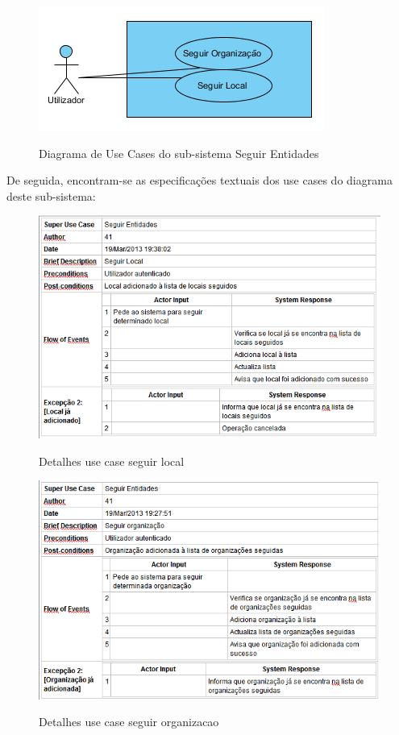\documentclass[12pt,a4paper]{article}
\begin{document}
\begin{figure}[h!]
\centering
\includegraphics[scale=1]{usecase/U_SeguirEntidades}
\label{usecase}
\caption{Diagrama de Use Cases do sub-sistema Seguir Entidades}
\end{figure}

De seguida, encontram-se as especificações textuais dos use cases do diagrama deste sub-sistema:\\


\begin{figure}[h!]
\centering
\includegraphics[scale=0.7]{d_usecase/seguirlocal}
\label{usecase}
\caption{Detalhes use case seguir local}
\end{figure}

\begin{figure}[h!]
\centering
\includegraphics[scale=0.7]{d_usecase/seguirorganizacao}
\label{usecase}
\caption{Detalhes use case seguir organizacao}
\end{figure}
\end{document}
